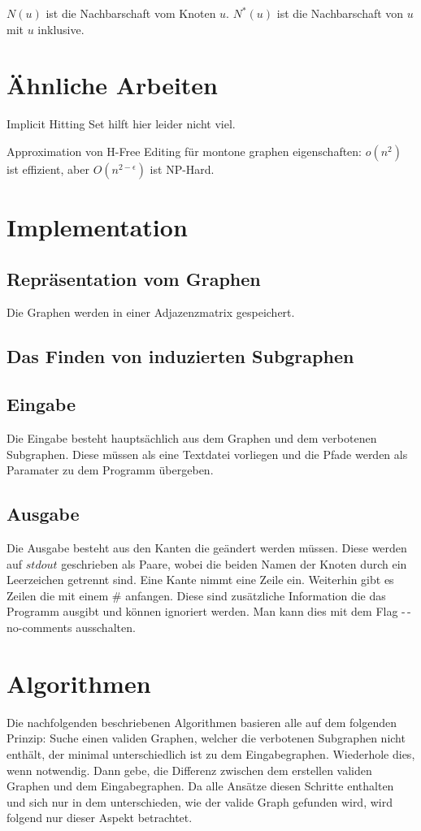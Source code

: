 \documentclass[12pt,a4paper,onecolumn,oneside,titlepage]{article}
\begin{document}
$N(u)$ ist die Nachbarschaft vom Knoten $u$. $N^{*}(u)$ ist die Nachbarschaft von $u$ mit $u$ inklusive.

\section{Ähnliche Arbeiten}
Implicit Hitting Set hilft hier leider nicht viel.\cite{Moreno13} 

Approximation von H-Free Editing für montone graphen eigenschaften: $o(n^2)$ ist effizient, aber $O(n^{2-\epsilon})$ ist NP-Hard.\cite{Alon09}

\section{Implementation}
\subsection{Repräsentation vom Graphen}
Die Graphen werden in einer Adjazenzmatrix gespeichert.


\subsection{Das Finden von induzierten Subgraphen}
\cite{Ullmann76}

\subsection{Eingabe}
Die Eingabe besteht hauptsächlich aus dem Graphen und dem verbotenen Subgraphen. Diese müssen als eine Textdatei vorliegen und die Pfade werden als Paramater zu dem Programm übergeben.

\subsection{Ausgabe}
Die Ausgabe besteht aus den Kanten die geändert werden müssen. Diese werden auf $stdout$ geschrieben als Paare, wobei die beiden Namen der Knoten durch ein Leerzeichen getrennt sind. Eine Kante nimmt eine Zeile ein.
Weiterhin gibt es Zeilen die mit einem \# anfangen. Diese sind zusätzliche Information die das Programm ausgibt und können ignoriert werden. Man kann dies mit dem Flag -\,-no-comments ausschalten.

\section{Algorithmen}
Die nachfolgenden beschriebenen Algorithmen basieren alle auf dem folgenden Prinzip: Suche einen validen Graphen, welcher die verbotenen Subgraphen nicht enthält, der minimal unterschiedlich ist zu dem Eingabegraphen. Wiederhole dies, wenn notwendig. Dann gebe, die Differenz zwischen dem erstellen validen Graphen und dem Eingabegraphen.
Da alle Ansätze diesen Schritte enthalten und sich nur in dem unterschieden, wie der valide Graph gefunden wird, wird folgend nur dieser Aspekt betrachtet.
\end{document}

